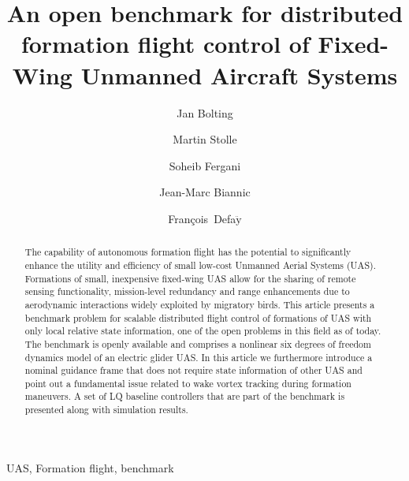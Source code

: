 \documentclass{ifacconf}
\newcommand{\Francois}{\mbox{Fran\c{c}ois Defa$\ddot{\textrm{y}}$}}
\begin{document}
\begin{frontmatter}

\title{An open benchmark for distributed formation flight control of Fixed-Wing Unmanned Aircraft Systems}

\author[First]{Jan Bolting}
\author[Second]{Martin Stolle}
\author[First]{Soheib Fergani}
\author[Second]{Jean-Marc Biannic}
\author[First]{\Francois}
 
\address[First]{Institut Supérieur de l'Aéronautique et de l'Espace (ISAE),
    31055 Toulouse, France (e-mail: jan.bolting@isae.fr, soheib.fergani@isae.fr, francois.defay@isae.fr)}
\address[Second]{Office National d'Études et de Recherches Aérospatiales (ONERA),
    31055 Toulouse, France (e-mail: jean-marc.biannic@onera.fr, martin.stolle@onera.fr)}
 
 

\begin{abstract}
The capability of autonomous formation flight has the potential to significantly enhance the utility and efficiency of small low-cost Unmanned Aerial Systems (UAS). Formations of small, inexpensive fixed-wing UAS allow for the sharing of remote sensing functionality, mission-level redundancy and range enhancements due to aerodynamic interactions widely exploited by migratory birds. This article presents a benchmark problem for scalable distributed flight control of formations of UAS with only local relative state information, one of the open problems in this field as of today. The benchmark is openly available and comprises a nonlinear six degrees of freedom dynamics model of an electric glider UAS.
In this article we furthermore introduce a nominal guidance frame that does not require state information of other UAS and point out a fundamental issue related to wake vortex tracking during formation maneuvers.
A set of LQ baseline controllers that are part of the benchmark is presented along with simulation results.
\end{abstract}
%
\begin{keyword}
UAS, Formation flight, benchmark
\end{keyword}

\end{frontmatter}
\end{document}
